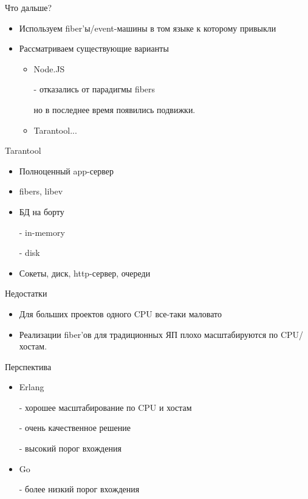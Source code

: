 \documentclass[aspectratio=169]{beamer}
\begin{document}
\begin{frame}{Что дальше?}
    \begin{itemize}
        \item Используем fiber'ы/event-машины
            в том языке к которому привыкли
        \item Рассматриваем существующие варианты
            \begin{itemize}
                \item Node.JS
                    \par - отказались от парадигмы fibers
                    \par но в последнее время появились подвижки.
                \item\pause Tarantool...
            \end{itemize}
    \end{itemize}
\end{frame}


\begin{frame}{Tarantool}
    \begin{itemize}
        \item Полноценный app-сервер
        \item fibers, libev
        \item БД на борту
            \par - in-memory
            \par - disk
        \item Сокеты, диск, http-сервер, очереди
    \end{itemize}
\end{frame}

\begin{frame}{Недостатки}
    \begin{itemize}
        \item Для больших проектов одного CPU все-таки маловато
        \item Реализации fiber'ов для традиционных
            ЯП плохо масштабируются по CPU/хостам.
    \end{itemize}
\end{frame}

\begin{frame}{Перспектива}
    \begin{itemize}
        \item Erlang
            \par - хорошее масштабирование по CPU и хостам
            \par - очень качественное решение
            \par - высокий порог вхождения
        \item Go
            \par - более низкий порог вхождения
    \end{itemize}
\end{frame}
\end{document}
